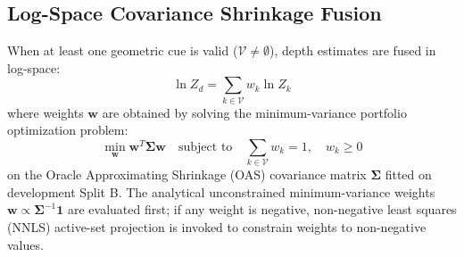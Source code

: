 \documentclass[]{spie}  %
\begin{document}
\subsection{Log-Space Covariance Shrinkage Fusion}
When at least one geometric cue is valid ($\mathcal{V} \neq \emptyset$), depth estimates are fused in log-space:
\begin{equation}
\ln Z_d = \sum_{k \in \mathcal{V}} w_k \ln Z_k
\end{equation}
where weights $\mathbf{w}$ are obtained by solving the minimum-variance portfolio optimization problem:
\begin{equation}
\min_{\mathbf{w}} \mathbf{w}^T \mathbf{\Sigma} \mathbf{w} \quad \text{subject to} \quad \sum_{k \in \mathcal{V}} w_k = 1, \quad w_k \ge 0
\end{equation}
on the Oracle Approximating Shrinkage (OAS) covariance matrix $\mathbf{\Sigma}$\cite{chen2010oas} fitted on development Split B. The analytical unconstrained minimum-variance weights $\mathbf{w} \propto \mathbf{\Sigma}^{-1} \mathbf{1}$ are evaluated first; if any weight is negative, non-negative least squares (NNLS) active-set projection is invoked to constrain weights to non-negative values.
\end{document}
